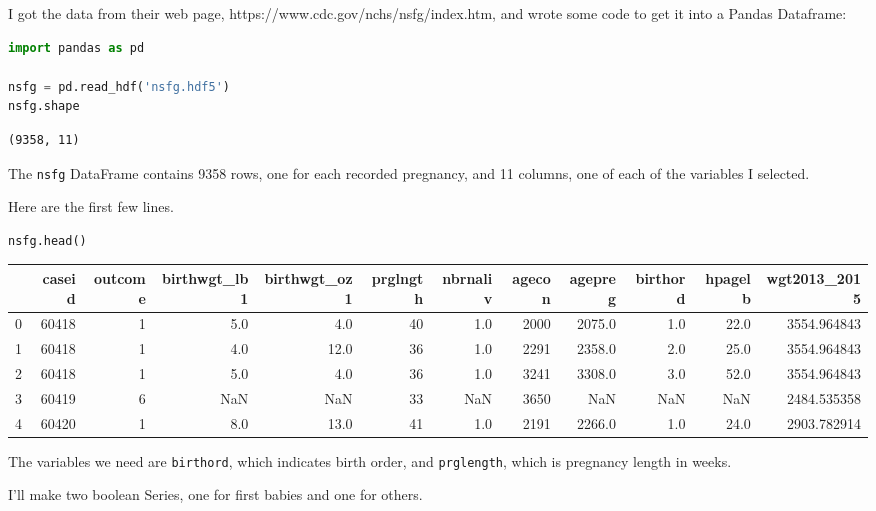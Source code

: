 I got the data from their web page,
https://www.cdc.gov/nchs/nsfg/index.htm, and wrote some code to get it
into a Pandas Dataframe:

\begin{lstlisting}[language=Python]
import pandas as pd

nsfg = pd.read_hdf('nsfg.hdf5')
nsfg.shape
\end{lstlisting}

\begin{lstlisting}[]
(9358, 11)
\end{lstlisting}

The \passthrough{\lstinline!nsfg!} DataFrame contains 9358 rows, one for
each recorded pregnancy, and 11 columns, one of each of the variables I
selected.

Here are the first few lines.

\begin{lstlisting}[language=Python]
nsfg.head()
\end{lstlisting}

\begin{tabular}{lrrrrrrrrrrr}
\toprule
{} &  caseid &  outcome &  birthwgt\_lb1 &  birthwgt\_oz1 &  prglngth &  nbrnaliv &  agecon &  agepreg &  birthord &  hpagelb &  wgt2013\_2015 \\
\midrule
0 &   60418 &        1 &           5.0 &           4.0 &        40 &       1.0 &    2000 &   2075.0 &       1.0 &     22.0 &   3554.964843 \\
1 &   60418 &        1 &           4.0 &          12.0 &        36 &       1.0 &    2291 &   2358.0 &       2.0 &     25.0 &   3554.964843 \\
2 &   60418 &        1 &           5.0 &           4.0 &        36 &       1.0 &    3241 &   3308.0 &       3.0 &     52.0 &   3554.964843 \\
3 &   60419 &        6 &           NaN &           NaN &        33 &       NaN &    3650 &      NaN &       NaN &      NaN &   2484.535358 \\
4 &   60420 &        1 &           8.0 &          13.0 &        41 &       1.0 &    2191 &   2266.0 &       1.0 &     24.0 &   2903.782914 \\
\bottomrule
\end{tabular}

The variables we need are \passthrough{\lstinline!birthord!}, which
indicates birth order, and \passthrough{\lstinline!prglength!}, which is
pregnancy length in weeks.

I'll make two boolean Series, one for first babies and one for others.

